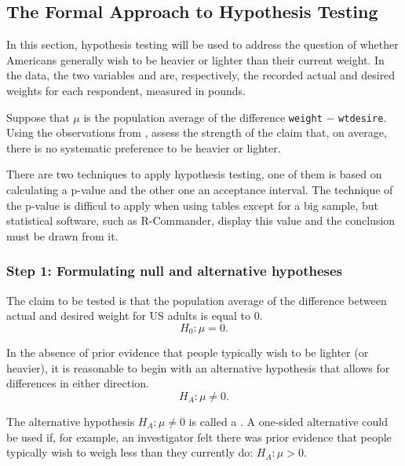 \subsection{The Formal Approach to Hypothesis Testing}
\label{formalHypothesisTesting}

In this section, hypothesis testing will be used to address the question of whether Americans generally wish to be heavier or lighter than their current weight. In the  data, the two variables  and  are, respectively, the recorded actual and desired weights for each respondent, measured in pounds. 

Suppose that $\mu$ is the population average of the difference \texttt{weight} $-$ \texttt{wtdesire}. Using the observations from , assess the strength of the claim that, on average, there is no systematic preference to be heavier or lighter.

There are two techniques to apply hypothesis testing, one of them is based on calculating a p-value and the other one an acceptance interval. The technique of the p-value is difficul to apply when using tables except for a big sample, but statistical software, such as R-Commander, display this value and the conclusion must be drawn from it.  




\subsubsection{Step 1: Formulating null and alternative hypotheses}

The claim to be tested is that the population average of the difference between actual and desired weight for US adults is equal to 0. 
\[H_0: \mu = 0.\]

In the absence of prior evidence that people typically wish to be lighter (or heavier), it is reasonable to begin with an alternative hypothesis that allows for differences in either direction.
\[H_A: \mu \neq 0.\]

The alternative hypothesis $H_A: \mu \neq 0$ is called a . A one-sided alternative could be used if, for example, an investigator felt there was prior evidence that people typically wish to weigh less than they currently do: $H_A: \mu > 0$. 


